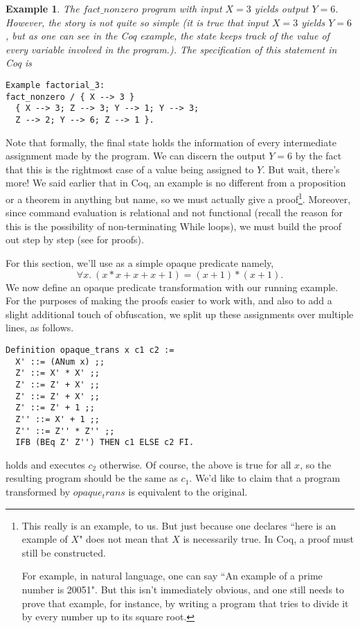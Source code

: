 \documentclass[compsoc,conference,a4paper,10pt,times]{IEEEtran}
\newtheorem{example}[theorem]{Example}
\begin{document}
\begin{example}\label{firstoff}
    The $fact\_nonzero$ program with input $X=3$ yields output $Y=6$.  However, the story is not quite so simple (it is true that input $X=3$ yields $Y=6$, but as one can see in the Coq example, the state keeps track of the value of every variable involved in the program.).  The specification of this statement in Coq is
\begin{verbatim}
Example factorial_3: 
fact_nonzero / { X --> 3 } 
  { X --> 3; Z --> 3; Y --> 1; Y --> 3; 
  Z --> 2; Y --> 6; Z --> 1 }.
\end{verbatim}
\end{example}
    Note that formally, the final state holds the information of every intermediate assignment made by the program.  We can discern the output $Y=6$ by the fact that this is the rightmost case of a value being assigned to $Y$.  But wait, there's more!  We said earlier that in Coq, an example is no different from a proposition or a theorem in anything but name, so we must actually give a proof\footnote{This really is an example, to us.  But just because one declares ``here is an example of $X$" does not mean that $X$ is necessarily true.  In Coq, a proof must still be constructed.\par For example, in natural language, one can say ``An example of a prime number is 20051".  But this isn't immediately obvious, and one still needs to prove that example, for instance, by writing a program that tries to divide it by every number up to its square root.}.  Moreover, since command evaluation is relational and not functional (recall the reason for this is the possibility of non-terminating While loops), we must build the proof out step by step (see \cite{WeiRepo} for proofs).

For this section, we'll use as a simple opaque predicate namely,
    \[
    	\forall x.\ (x * x + x + x + 1) = (x + 1) * (x + 1).
    \]
We now define an opaque predicate transformation with our running example.  
    For the purposes of making the proofs easier to work with, and also to add a slight additional touch of obfuscation, we split up these assignments over multiple lines, as follows.
\begin{verbatim}
Definition opaque_trans x c1 c2 :=
  X' ::= (ANum x) ;;
  Z' ::= X' * X' ;;
  Z' ::= Z' + X' ;;
  Z' ::= Z' + X' ;;
  Z' ::= Z' + 1 ;;
  Z'' ::= X' + 1 ;;
  Z'' ::= Z'' * Z'' ;;
  IFB (BEq Z' Z'') THEN c1 ELSE c2 FI.
\end{verbatim}
holds and executes $c_2$ otherwise.  Of course, the above is true for all $x$, so the resulting program should be the same as $c_1$.  We'd like to claim that a program transformed by $opaque_trans$ is equivalent to the original.
\end{document}
